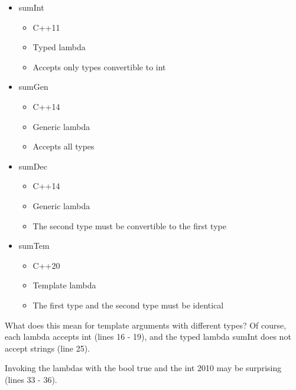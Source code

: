 \begin{itemize}
\item 
sumInt
\begin{itemize}
\item 
C++11

\item 
Typed lambda

\item 
Accepts only types convertible to int
\end{itemize}

\item 
sumGen
\begin{itemize}
\item 
C++14

\item 
Generic lambda

\item 
Accepts all types
\end{itemize}

\item 
sumDec
\begin{itemize}
\item 
C++14

\item 
Generic lambda

\item 
The second type must be convertible to the first type
\end{itemize}

\item 
sumTem
\begin{itemize}
\item 
C++20

\item 
Template lambda

\item 
The first type and the second type must be identical
\end{itemize}
\end{itemize}

What does this mean for template arguments with different types? Of course, each lambda accepts int (lines 16 - 19), and the typed lambda sumInt does not accept strings (line 25).

Invoking the lambdas with the bool true and the int 2010 may be surprising (lines 33 - 36).

